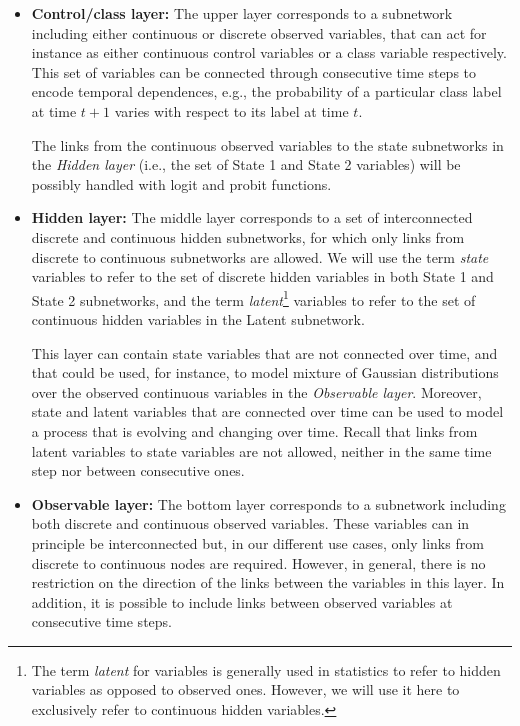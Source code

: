 \begin{itemize}

\item \textbf{Control/class layer:} The upper layer corresponds to a subnetwork including either continuous or discrete observed variables, that can act for instance as either continuous control variables or a class variable respectively. This set of variables can be connected through consecutive time steps to encode temporal dependences, e.g., the probability of a particular class label at time $t+1$ varies with respect to its label at time $t$. 

The links from the continuous observed variables to the state subnetworks in the \textit{Hidden layer} (i.e., the set of State 1 and State 2 variables) will be possibly handled with logit and probit functions.

\item \textbf{Hidden layer:}  The middle layer corresponds to a set of interconnected discrete and continuous hidden subnetworks, for which only links from discrete to continuous subnetworks are allowed. We will use the term \textit{state} variables to refer to the set of discrete hidden variables in both State 1 and State 2 subnetworks, and the term \textit{latent}\footnote{The term \textit{latent} for variables is generally used in statistics to refer to hidden variables as opposed to observed ones. However, we will use it here to exclusively refer to continuous hidden variables.} variables to refer to the set of continuous hidden variables in the Latent subnetwork.

This layer can contain state variables that are not connected over time, and that could be used, for instance, to model mixture of Gaussian distributions over the observed continuous variables in the \textit{Observable layer}. Moreover, state and latent variables that are connected over time can be used to model a process that is evolving and changing over time. Recall that links from latent variables to state variables are not allowed, neither in the same time step nor between consecutive ones.

\item \textbf{Observable layer:} The bottom layer corresponds to a subnetwork including both discrete and continuous observed variables. These variables can in principle be interconnected but, in our different use cases, only links from discrete to continuous nodes are required. However, in general, there is no restriction on the direction of the links between the variables in this layer. In addition, it is possible to include links between observed variables at consecutive time steps.

\end{itemize} 


